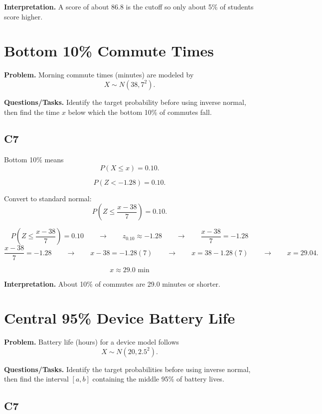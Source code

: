 	\textbf{Interpretation.} A score of about 86.8 is the cutoff so only about 5\% of students score higher.
	
	\section{Bottom 10\% Commute Times}
	
	\textbf{Problem.} Morning commute times (minutes) are modeled by
	\[
	X \sim N(38, 7^2).
	\]
	
	\textbf{Questions/Tasks.} Identify the target probability before using inverse normal, then find the time $x$ below which the bottom 10\% of commutes fall.
	
	\subsection*{C7}
	
	Bottom 10\% means
	\[
	P(X \leq x) = 0.10.
	\]
	
	\[
	P(Z<-1.28)=0.10.
	\]
	
	
	Convert to standard normal:
	\[
	P\left(Z \leq \frac{x - 38}{7}\right) = 0.10.
	\]
	
	\[
	P\left(Z \leq \frac{x - 38}{7}\right)=0.10
	\qquad \longrightarrow \qquad
	z_{0.10}\approx -1.28
	\qquad \longrightarrow \qquad
	\frac{x - 38}{7}=-1.28
	\]
	\[
	\frac{x - 38}{7}=-1.28
	\qquad \longrightarrow \qquad
	x-38=-1.28(7)
	\qquad \longrightarrow \qquad
	x=38-1.28(7)
	\qquad \longrightarrow \qquad
	x=29.04.
	\]
	
	\[
	x \approx 29.0\text{ min}
	\]
	
	\textbf{Interpretation.} About 10\% of commutes are 29.0 minutes or shorter.
	
	\section{Central 95\% Device Battery Life}
	
	\textbf{Problem.} Battery life (hours) for a device model follows
	\[
	X \sim N(20, 2.5^2).
	\]
	
	\textbf{Questions/Tasks.} Identify the target probabilities before using inverse normal, then find the interval $[a,b]$ containing the middle 95\% of battery lives.
	
	\subsection*{C7}
	
